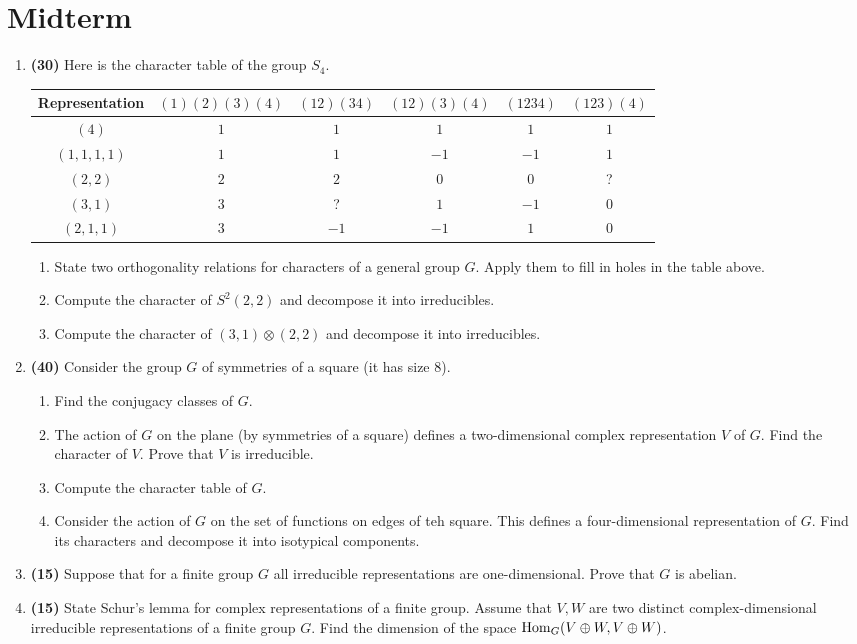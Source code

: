 \documentclass[../notes.tex]{subfiles}
\begin{document}
\section{Midterm}
\begin{enumerate}
    \item \textbf{(30)} Here is the character table of the group $S_4$.
    \begin{center}
        \begin{tabular}{||cccccc||}
            \hline
            Representation & $(1)(2)(3)(4)$ & $(12)(34)$ & $(12)(3)(4)$ & $(1234)$ & $(123)(4)$\\
            \hline\hline
            $(4)$       & $1$ & $1$  & $1$  & $1$  & $1$\\ \hline
            $(1,1,1,1)$ & $1$ & $1$  & $-1$ & $-1$ & $1$\\ \hline
            $(2,2)$     & $2$ & $2$  & $0$  & $0$  & ?  \\ \hline
            $(3,1)$     & $3$ & ?    & $1$  & $-1$ & $0$\\ \hline
            $(2,1,1)$   & $3$ & $-1$ & $-1$ & $1$  & $0$\\ \hline
        \end{tabular}
    \end{center}
    \begin{enumerate}
        \item State two orthogonality relations for characters of a general group $G$. Apply them to fill in holes in the table above.
        \item Compute the character of $S^2(2,2)$ and decompose it into irreducibles.
        \item Compute the character of $(3,1)\otimes(2,2)$ and decompose it into irreducibles.
    \end{enumerate}
    \item \textbf{(40)} Consider the group $G$ of symmetries of a square (it has size 8).
    \begin{enumerate}
        \item Find the conjugacy classes of $G$.
        \item The action of $G$ on the plane (by symmetries of a square) defines a two-dimensional complex representation $V$ of $G$. Find the character of $V$. Prove that $V$ is irreducible.
        \item Compute the character table of $G$.
        \item Consider the action of $G$ on the set of functions on edges of teh square. This defines a four-dimensional representation of $G$. Find its characters and decompose it into isotypical components.
    \end{enumerate}
    \item \textbf{(15)} Suppose that for a finite group $G$ all irreducible representations are one-dimensional. Prove that $G$ is abelian.
    \item \textbf{(15)} State Schur's lemma for complex representations of a finite group. Assume that $V,W$ are two distinct complex-dimensional irreducible representations of a finite group $G$. Find the dimension of the space $\operatorname{Hom}_G(V\oplus W,V\oplus W)$.
\end{enumerate}
\end{document}
